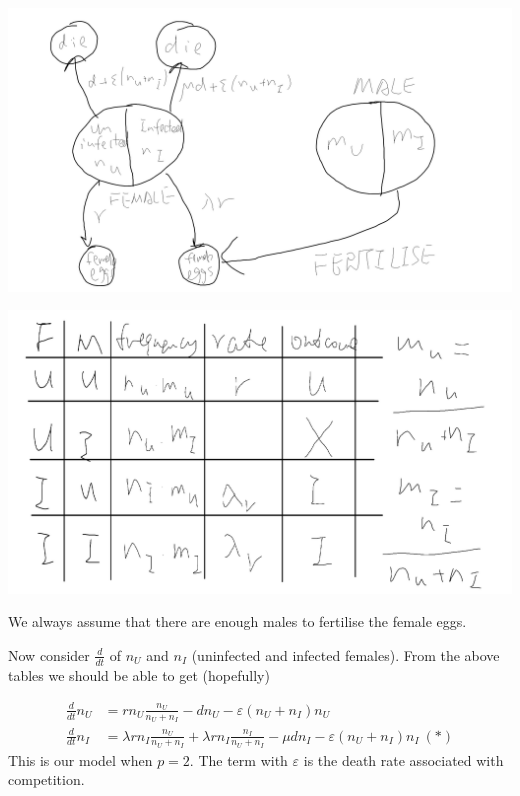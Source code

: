 \documentclass[a4paper]{article}
\begin{document}
\includegraphics[scale=0.7]{image/Bio_02.png}

\includegraphics[scale=0.5]{image/Bio_03.png}

We always assume that there are enough males to fertilise the female eggs.

Now consider $\frac{d}{dt}$ of $n_U$ and $n_I$ (uninfected and infected females). From the above tables we should be able to get (hopefully)

\begin{equation*}
\begin{aligned}
\frac{d}{dt} n_U &= r n_U \frac{n_U}{n_U + n_I} - dn_U - \varepsilon (n_U+n_I) n_U\\
\frac{d}{dt} n_I &= \lambda r n_I \frac{n_U}{n_U + n_I} + \lambda r n_I \frac{n_I}{n_U + n_I} - \mu d n_I - \varepsilon (n_U+n_I) n_I \ (*)
\end{aligned}
\end{equation*}
This is our model when $p=2$. The term with $\varepsilon$ is the death rate associated with competition.
\end{document}
